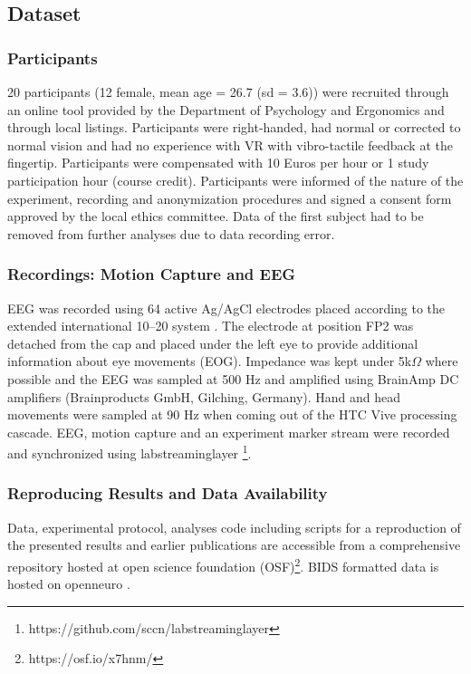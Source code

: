 
\subsection{Dataset}

\subsubsection{Participants}
20 participants (12 female, mean age = 26.7 (sd = 3.6)) were recruited through an online tool provided by the Department of Psychology and Ergonomics and through local listings. Participants were right-handed, had normal or corrected to normal vision and had no experience with VR with vibro-tactile feedback at the fingertip. Participants were compensated with 10 Euros per hour or 1 study participation hour (course credit). Participants were informed of the nature of the experiment, recording and anonymization procedures and signed a consent form approved by the local ethics committee.
Data of the first subject had to be removed from further analyses due to data recording error.

\subsubsection{Recordings: Motion Capture and EEG}
EEG was recorded using 64 active Ag/AgCl electrodes placed according to the extended international 10–20 system \cite{Chatrian1985-ys}. The electrode at position FP2 was detached from the cap and placed under the left eye to provide additional information about eye movements (EOG). Impedance was kept under 5k$\Omega$ where possible and the EEG was sampled at 500 Hz and amplified using BrainAmp DC amplifiers (Brainproducts GmbH, Gilching, Germany). Hand and head movements were sampled at 90 Hz when coming out of the HTC Vive processing cascade. EEG, motion capture and an experiment marker stream were recorded and synchronized using labstreaminglayer \footnote{https://github.com/sccn/labstreaminglayer}.

\subsubsection{Reproducing Results and Data Availability}
Data, experimental protocol, analyses code including scripts for a reproduction of the presented results and earlier publications are accessible from a comprehensive repository hosted at open science foundation (OSF)\footnote{https://osf.io/x7hnm/}. BIDS formatted data is hosted on openneuro \cite{ds003846:1.0.0}.

